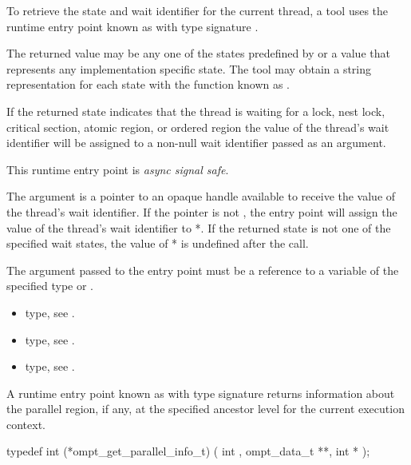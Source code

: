 To retrieve the state and wait identifier for the current thread,
a tool uses the runtime entry point known as
 with type signature .

The returned value may be any one of the states predefined by
 or a value that represents any implementation
specific state.
The tool may obtain a string representation for each state with the
function known as .

If the returned state indicates that the thread is waiting for a
lock, nest lock, critical section, atomic region, or ordered region
the value of the thread's wait identifier will be assigned to a
non-null wait identifier passed as an argument.

This runtime entry point is \emph{async signal safe}.

\argdesc

The argument  is a pointer to an opaque handle
available to receive the value of the thread's wait identifier.  If
the  pointer is not , the entry point
will assign the value of the thread's wait identifier to
*.  If the returned state is not one of the specified
wait states, the value of * is undefined after the call.

\constraints
The argument passed to the entry point must be a reference
to a variable of the specified type or .

\crossreferences
\begin{itemize}
\item {} type, see .
\item {} type, see .
\item {} type, see .
\end{itemize}


\label{sec:ompt_get_parallel_info_t}
\label{sec:ompt_get_parallel_info}

\summary

A runtime entry point known as 
with type signature 
returns information about
the parallel region, if any, at the specified ancestor level
for the current execution context.

\format
\begin{ccppspecific}
\begin{omptInquiry}
typedef int (*ompt_get_parallel_info_t) (
  int ,
  ompt_data_t **,
  int *
);
\end{omptInquiry}
\end{ccppspecific}


